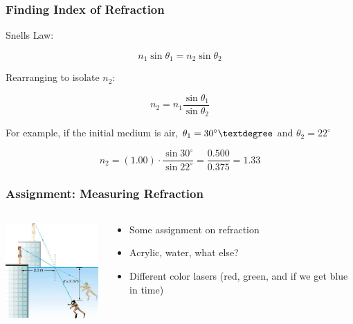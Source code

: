 \documentclass{beamer}
\begin{document}
\begin{frame}\frametitle{Finding Index of Refraction}

Snells Law:

\begin{equation}
n_1 \sin{\theta_1} = n_2 \sin{\theta_2}
\end{equation}

Rearranging to isolate $n_2$:

\begin{equation}
n_2 = n_1 \frac{\sin{\theta_1}}{\sin{\theta_2}}
\end{equation}

For example, if the initial medium is air, $\theta_1 = 30^\circ \textdegree$ and $\theta_2 = 22^\circ$

\begin{equation}
n_2 = (1.00) \cdot \frac{\sin{30^\circ}}{\sin{22^\circ}} = \frac{0.500}{0.375} = 1.33
\end{equation}

\end{frame}

\begin{frame}\frametitle{Assignment: Measuring Refraction}
\begin{columns}
\begin{column}{4cm}
\begin{center}
\includegraphics[width=4cm]{fig/refract9.jpg}
\end{center}
\end{column}
\begin{column}{7cm}
\begin{itemize}
\item Some assignment on refraction
\item Acrylic, water, what else?
\item Different color lasers (red, green, and if we get blue in time)
\end{itemize}
\end{column}
\end{columns}
\end{frame}
\end{document}
